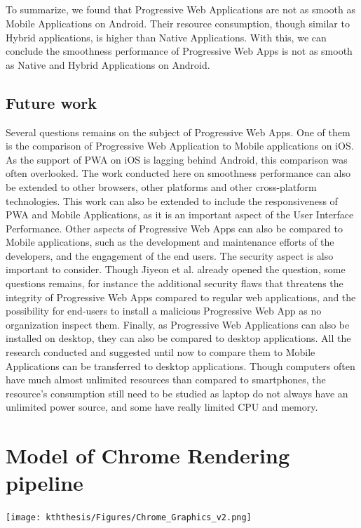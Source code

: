 \documentclass{kththesis}
\begin{document}
\paragraph{}
To summarize, we found that Progressive Web Applications are not as smooth as Mobile Applications on Android. Their resource consumption, though similar to Hybrid applications, is higher than Native Applications. With this, we can conclude the smoothness performance of Progressive Web Apps is not as smooth as Native and Hybrid Applications on Android. 

\section{Future work}
Several questions remains on the subject of Progressive Web Apps. One of them is the comparison of Progressive Web Application to Mobile applications on iOS. As the support of PWA on iOS is lagging behind Android, this comparison was often overlooked. \newline
The work conducted here on smoothness performance can also be extended to other browsers, other platforms and other cross-platform technologies. This work can also be extended to include the responsiveness of PWA and Mobile Applications, as it is an important aspect of the User Interface Performance. \newline
Other aspects of Progressive Web Apps can also be compared to Mobile applications, such as the development and maintenance efforts of the developers, and the engagement of the end users. \newline
The security aspect is also important to consider. Though Jiyeon et al. \cite{Pride_Prejudice} already opened the question, some questions remains, for instance the additional security flaws that threatens the integrity of Progressive Web Apps compared to regular web applications, and the possibility for end-users to install a malicious Progressive Web App as no organization inspect them.
Finally, as Progressive Web Applications can also be installed on desktop, they can also be compared to desktop applications. All the research conducted and suggested until now to compare them to Mobile Applications can be transferred to desktop applications. Though computers often have much almost unlimited resources than compared to smartphones, the resource's consumption still need to be studied as laptop do not always have an unlimited power source, and some have really limited CPU and memory. 



\listoffigures
\printbibliography[heading=bibintoc]

\appendix
    \chapter{Model of Chrome Rendering pipeline}
    \label{annex:chrome_model}
    
    \begin{center}
        \texttt{[image: kththesis/Figures/Chrome\_Graphics\_v2.png]}
    \end{center}


\tailmatter
\end{document}
